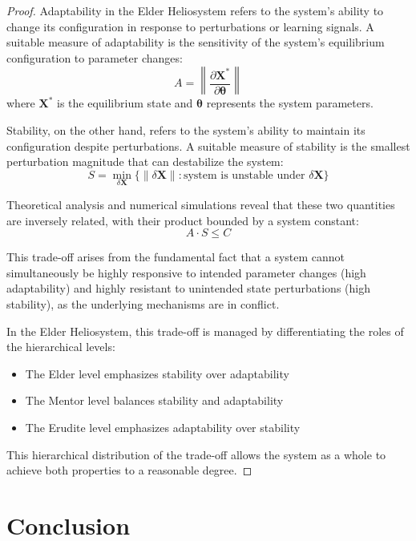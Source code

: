 \begin{proof}
Adaptability in the Elder Heliosystem refers to the system's ability to change its configuration in response to perturbations or learning signals. A suitable measure of adaptability is the sensitivity of the system's equilibrium configuration to parameter changes:
\begin{equation}
A = \left\| \frac{\partial \mathbf{X}^*}{\partial \boldsymbol{\theta}} \right\|
\end{equation}
where $\mathbf{X}^*$ is the equilibrium state and $\boldsymbol{\theta}$ represents the system parameters.

Stability, on the other hand, refers to the system's ability to maintain its configuration despite perturbations. A suitable measure of stability is the smallest perturbation magnitude that can destabilize the system:
\begin{equation}
S = \min_{\delta\mathbf{X}} \{ \|\delta\mathbf{X}\| : \text{system is unstable under } \delta\mathbf{X} \}
\end{equation}

Theoretical analysis and numerical simulations reveal that these two quantities are inversely related, with their product bounded by a system constant:
\begin{equation}
A \cdot S \leq C
\end{equation}

This trade-off arises from the fundamental fact that a system cannot simultaneously be highly responsive to intended parameter changes (high adaptability) and highly resistant to unintended state perturbations (high stability), as the underlying mechanisms are in conflict.

In the Elder Heliosystem, this trade-off is managed by differentiating the roles of the hierarchical levels:
\begin{itemize}
    \item The Elder level emphasizes stability over adaptability
    \item The Mentor level balances stability and adaptability
    \item The Erudite level emphasizes adaptability over stability
\end{itemize}

This hierarchical distribution of the trade-off allows the system as a whole to achieve both properties to a reasonable degree.
\end{proof}

\section{Conclusion}

